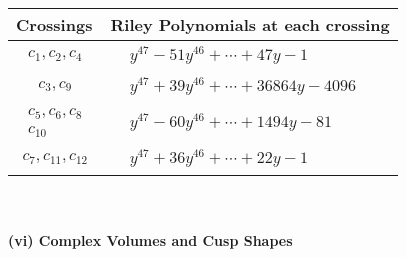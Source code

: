 \documentclass[1p]{elsarticle_modified}
\theoremstyle{definition}
\begin{document}
\begin{tabular}{m{50pt}|m{274pt}}
Crossings & \hspace{64pt}Riley Polynomials at each crossing \\
\hline $$\begin{aligned}c_{1},c_{2},c_{4}\end{aligned}$$&$\begin{aligned}
&y^{47}-51 y^{46}+\cdots+47 y-1
\end{aligned}$\\
\hline $$\begin{aligned}c_{3},c_{9}\end{aligned}$$&$\begin{aligned}
&y^{47}+39 y^{46}+\cdots+36864 y-4096
\end{aligned}$\\
\hline $$\begin{aligned}c_{5},c_{6},c_{8}\\c_{10}\end{aligned}$$&$\begin{aligned}
&y^{47}-60 y^{46}+\cdots+1494 y-81
\end{aligned}$\\
\hline $$\begin{aligned}c_{7},c_{11},c_{12}\end{aligned}$$&$\begin{aligned}
&y^{47}+36 y^{46}+\cdots+22 y-1
\end{aligned}$\\
\hline
\end{tabular}\\~\\
\newpage\flushleft \textbf{(vi) Complex Volumes and Cusp Shapes}
\end{document}
